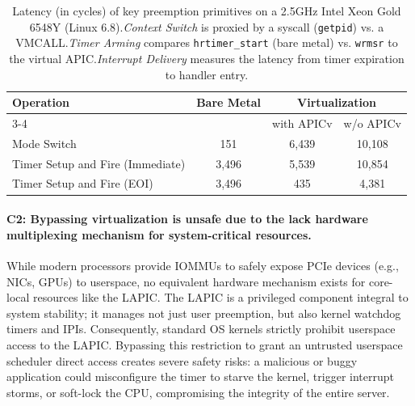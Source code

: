 \begin{table}[h]
\centering
\begin{tabular}{lccc}
\toprule
\multirow{2}{*}{\textbf{Operation}} & \multirow{2}{*}{\textbf{Bare Metal}}  & \multicolumn{2}{c}{\textbf{Virtualization}} \\ \cmidrule(l){3-4} 
                                    & & \small with APICv     & \small w/o APICv     \\
Mode Switch                & 151            & 6,439          & 10,108            \\
Timer Setup and Fire (Immediate)                        & 3,496            & 5,539          & 10,854             \\
Timer Setup and Fire (EOI)                        & 3,496            & 435          & 4,381             \\
\bottomrule
\end{tabular}
\caption{Latency (in cycles) of key preemption primitives on a 2.5GHz Intel Xeon Gold 6548Y (Linux 6.8).\textit{Context Switch} is proxied by a syscall (\texttt{getpid}) vs. a VMCALL.\textit{Timer Arming} compares \texttt{hrtimer\_start} (bare metal) vs. \texttt{wrmsr} to the virtual APIC.\textit{Interrupt Delivery} measures the latency from timer expiration to handler entry.}
\label{tab:operation-overhead}
\end{table}

\paragraph{C2: Bypassing virtualization is unsafe due to the lack hardware multiplexing mechanism for system-critical resources.}
While modern processors provide IOMMUs to safely expose PCIe devices (e.g., NICs, GPUs) to userspace, no equivalent hardware mechanism exists for core-local resources like the LAPIC.
The LAPIC is a privileged component integral to system stability; it manages not just user preemption, but also kernel watchdog timers and IPIs.
Consequently, standard OS kernels strictly prohibit userspace access to the LAPIC.
Bypassing this restriction to grant an untrusted userspace scheduler direct access creates severe safety risks: a malicious or buggy application could misconfigure the timer to starve the kernel, trigger interrupt storms, or soft-lock the CPU, compromising the integrity of the entire server.

